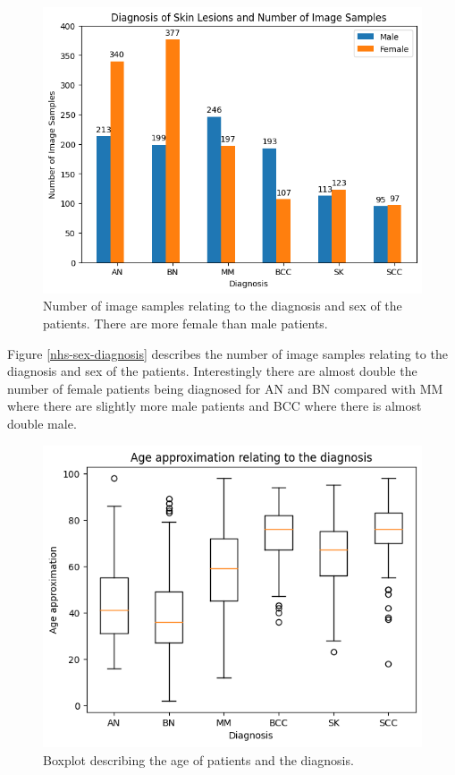 \begin{figure}
	\centering
	\includegraphics[scale=0.8]{images/nhs/nhs-sex-diagnosis.png}
	\caption{Number of image samples relating to the diagnosis and sex of the patients. There are more female than male patients.} 
\end{figure}\label{nhs-sex-diagnosis}

Figure \ref{nhs-sex-diagnosis} describes the number of image samples relating to the diagnosis and sex of the patients. Interestingly there are almost double the number of female patients being diagnosed for AN and BN compared with MM where there are slightly more male patients and BCC where there is almost double male.

\begin{figure}
	\centering
	\includegraphics[scale=0.8]{images/nhs/nhs-diagnosis-age.png}
	\caption{Boxplot describing the age of patients and the diagnosis.} 
\end{figure}\label{nhs-diagnosis-age}

